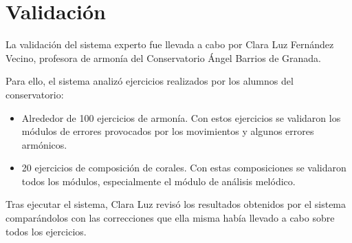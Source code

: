 \section{Validación}

La validación del sistema experto fue llevada a cabo por Clara Luz Fernández Vecino, profesora de armonía del Conservatorio Ángel Barrios de Granada.

Para ello, el sistema analizó ejercicios realizados por los alumnos del conservatorio:

\begin{itemize}

	\item Alrededor de 100 ejercicios de armonía. Con estos ejercicios se validaron los módulos de errores provocados por los movimientos y algunos errores armónicos. 

	\item 20 ejercicios de composición de corales. Con estas composiciones se validaron todos los módulos, especialmente el módulo de análisis melódico.

\end{itemize}

Tras ejecutar el sistema, Clara Luz revisó los resultados obtenidos por el sistema comparándolos con las correcciones que ella misma había llevado a cabo sobre todos los ejercicios.